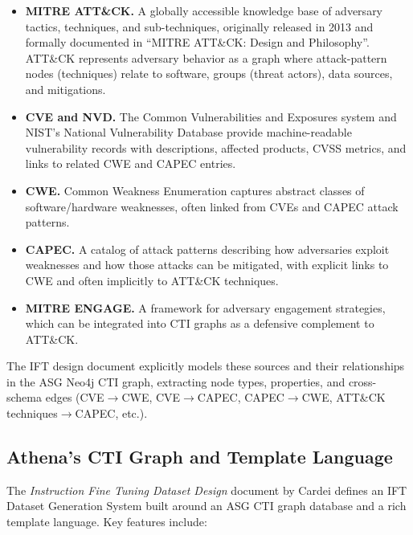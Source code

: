 \documentclass[sigconf]{acmart}
\begin{document}
\begin{itemize}
  \item \textbf{MITRE ATT\&CK.} A globally accessible knowledge base of adversary tactics, techniques, and sub-techniques, originally released in 2013 and formally documented in ``MITRE ATT\&CK: Design and Philosophy''.\cite{strom2018mitreattck} ATT\&CK represents adversary behavior as a graph where attack-pattern nodes (techniques) relate to software, groups (threat actors), data sources, and mitigations.
  \item \textbf{CVE and NVD.} The Common Vulnerabilities and Exposures system and NIST's National Vulnerability Database provide machine-readable vulnerability records with descriptions, affected products, CVSS metrics, and links to related CWE and CAPEC entries.\cite{mitreCVE}
  \item \textbf{CWE.} Common Weakness Enumeration captures abstract classes of software/hardware weaknesses, often linked from CVEs and CAPEC attack patterns.\cite{mitreCWE}
  \item \textbf{CAPEC.} A catalog of attack patterns describing how adversaries exploit weaknesses and how those attacks can be mitigated, with explicit links to CWE and often implicitly to ATT\&CK techniques.\cite{mitreCAPEC}
  \item \textbf{MITRE ENGAGE.} A framework for adversary engagement strategies, which can be integrated into CTI graphs as a defensive complement to ATT\&CK.\cite{cardei2025ift}
\end{itemize}

The IFT design document explicitly models these sources and their relationships in the ASG Neo4j CTI graph, extracting node types, properties, and cross-schema edges (CVE$\rightarrow$CWE, CVE$\rightarrow$CAPEC, CAPEC$\rightarrow$CWE, ATT\&CK techniques$\rightarrow$CAPEC, etc.).\cite{cardei2025ift}

\subsection{Athena's CTI Graph and Template Language}

The \emph{Instruction Fine Tuning Dataset Design} document by Cardei defines an IFT Dataset Generation System built around an ASG CTI graph database and a rich template language.\cite{cardei2025ift} Key features include:
\end{document}
